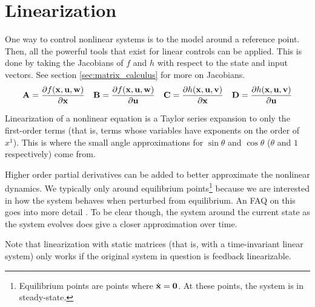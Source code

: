 \section{Linearization}

One way to control nonlinear \glspl{system} is to
 the \gls{model} around a reference point.
Then, all the powerful tools that exist for linear controls can be applied. This
is done by taking the Jacobians of $f$ and $h$ with respect to the state and
input vectors. See section \ref{sec:matrix_calculus} for more on Jacobians.
\begin{equation*}
  \mathbf{A} = \frac{\partial f(\mathbf{x}, \mathbf{u}, \mathbf{w})}{\partial \mathbf{x}}
  \quad
  \mathbf{B} = \frac{\partial f(\mathbf{x}, \mathbf{u}, \mathbf{w})}{\partial \mathbf{u}}
  \quad
  \mathbf{C} = \frac{\partial h(\mathbf{x}, \mathbf{u}, \mathbf{v})}{\partial \mathbf{x}}
  \quad
  \mathbf{D} = \frac{\partial h(\mathbf{x}, \mathbf{u}, \mathbf{v})}{\partial \mathbf{u}}
\end{equation*}

Linearization of a nonlinear equation is a Taylor series expansion to only the
first-order terms (that is, terms whose variables have exponents on the order of
$x^1$). This is where the small angle approximations for $\sin\theta$ and
$\cos\theta$ ($\theta$ and $1$ respectively) come from.

Higher order partial derivatives can be added to better approximate the
nonlinear dynamics. We typically only  around
equilibrium points\footnote{Equilibrium points are points where
$\dot{\mathbf{x}} = \mathbf{0}$. At these points, the system is in steady-state.}
because we are interested in how the \gls{system} behaves when perturbed from
equilibrium. An FAQ on this goes into more detail
\cite{bib:linearize_equilibrium_point}. To be clear though,
 the \gls{system} around the current
\gls{state} as the \gls{system} evolves does give a closer approximation over
time.

Note that linearization with static matrices (that is, with a time-invariant
linear \gls{system}) only works if the original \gls{system} in question is
feedback linearizable.
